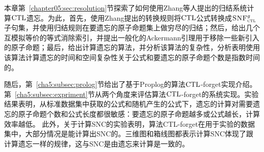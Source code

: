 本章第~\ref{chapter05:sec:resolution}节探索了如何使用Zhang等人提出的归结系统计算$\textrm{CTL}$遗忘。为此，首先，使用Zhang提出的转换规则将$\textrm{CTL}$公式转换成${\textsc{SNF}_{\textsc{ctl}}^g}$子句集，并使用归结规则在要遗忘的原子命题集上做穷尽的归结；然后，给出几个互模拟等价的等式消除索引，并提出一般化的Ackermann引理用于移除一些新引入的原子命题；最后，给出计算遗忘的算法，并分析该算法的复杂性，分析表明使用该算法计算遗忘的时间和空间复杂性关于公式和要遗忘的原子命题个数是指数时间的。


随后，第~\ref{cha5:subsec:prolog}节给出了基于Proplog的算法$\textrm{CTL}$-forget实现介绍。第~\ref{cha5:subsec:expriment}节从两个角度来评估算法$\textrm{CTL}$-forget的系统实现。实验结果表明，从标准数据集中获取的公式和随机产生的公式下，遗忘的计算对需要遗忘的原子命题个数和公式长度都很敏感：要遗忘的原子命题越多或公式越长，计算效率越低。
此外，关于计算SNC的实验表明，算法CTL-forget在用于实验的数据集中，大部分情况是能计算出SNC的。三维图和箱线图都表示计算SNC体现了跟计算遗忘一样的规律，这与SNC是由遗忘来计算是一致的。
